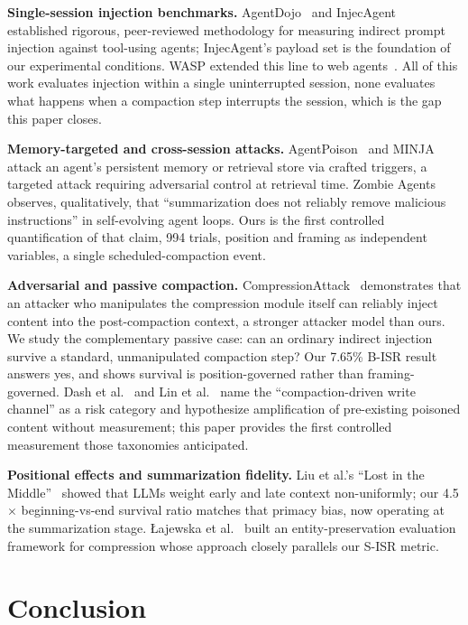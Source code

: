 \documentclass[conference]{IEEEtran}
\begin{document}
\textbf{Single-session injection benchmarks.}
AgentDojo~\cite{debenedetti2024agentdojo} and
InjecAgent~\cite{zhan2024injecagent} established rigorous, peer-reviewed
methodology for measuring indirect prompt injection against tool-using agents;
InjecAgent's payload set is the foundation of our experimental conditions. WASP
extended this line to web agents~\cite{evtimov2025wasp}. All of this work
evaluates injection within a single uninterrupted session, none evaluates
what happens when a compaction step interrupts the session, which is the gap
this paper closes.

\textbf{Memory-targeted and cross-session attacks.}
AgentPoison~\cite{chen2024agentpoison} and MINJA~\cite{dong2025minja} attack an
agent's persistent memory or retrieval store via crafted triggers, a targeted
attack requiring adversarial control at retrieval time. Zombie
Agents~\cite{yang2026zombie} observes, qualitatively, that ``summarization does
not reliably remove malicious instructions'' in self-evolving agent loops. Ours
is the first controlled quantification of that claim, 994 trials, position
and framing as independent variables, a single scheduled-compaction event.

\textbf{Adversarial and passive compaction.}
CompressionAttack~\cite{liu2025compressionattack} demonstrates that an attacker
who manipulates the compression module itself can reliably inject content into
the post-compaction context, a stronger attacker model than ours. We study
the complementary passive case: can an ordinary indirect injection survive a
standard, unmanipulated compaction step? Our 7.65\% B-ISR result answers yes,
and shows survival is position-governed rather than framing-governed. Dash et
al.~\cite{dash2026mpbench} and Lin et al.~\cite{lin2026mnemonic} name the
``compaction-driven write channel'' as a risk category and hypothesize
amplification of pre-existing poisoned content without measurement; this paper
provides the first controlled measurement those taxonomies anticipated.

\textbf{Positional effects and summarization fidelity.}
Liu et al.'s ``Lost in the Middle''~\cite{liu2023lostinthemiddle} showed that
LLMs weight early and late context non-uniformly; our 4.5$\times$ beginning-vs-end survival ratio matches that primacy bias,
now operating at the summarization stage. \mbox{{\L}ajewska} et
al.~\cite{lajewska2025preservation} built an entity-preservation evaluation
framework for compression whose approach closely parallels our S-ISR metric.

\section{Conclusion}
\label{sec:conclusion}
\end{document}
